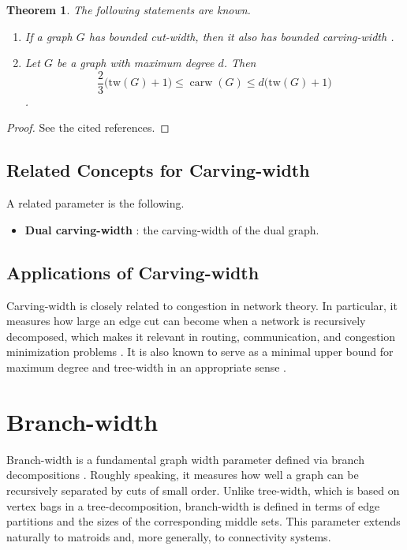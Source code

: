 \documentclass[10pt]{book}
\newcommand{\tw}{\mathrm{tw}}       %
\newtheorem{theorem}{Theorem}[section]
\theoremstyle{definition}
\begin{document}
\begin{theorem}
The following statements are known.
\begin{enumerate}
    \item If a graph \(G\) has bounded cut-width, then it also has bounded carving-width \cite{326}.

    \item Let \(G\) be a graph with maximum degree \(d\). Then
    \[
    \frac{2}{3}\bigl(\tw(G)+1\bigr)
    \leq
    \operatorname{carw}(G)
    \leq
    d\bigl(\tw(G)+1\bigr)
    \]
      \cite{bienstock1990embedding}.
\end{enumerate}
\end{theorem}

\begin{proof}
See the cited references.
\end{proof}

\subsection{Related Concepts for Carving-width}
A related parameter is the following.

\begin{itemize}
    \item \textbf{Dual carving-width} \cite{424}: the carving-width of the dual graph.
\end{itemize}

\subsection{Applications of Carving-width}
Carving-width is closely related to congestion in network theory.  
In particular, it measures how large an edge cut can become when a network is recursively decomposed, which makes it relevant in routing, communication, and congestion minimization problems \cite{256}.  
It is also known to serve as a minimal upper bound for maximum degree and tree-width in an appropriate sense \cite{311,337}.

\section{Branch-width}

Branch-width is a fundamental graph width parameter defined via branch decompositions \cite{9,10,47,282}.  
Roughly speaking, it measures how well a graph can be recursively separated by cuts of small order.  
Unlike tree-width, which is based on vertex bags in a tree-decomposition, branch-width is defined in terms of edge partitions and the sizes of the corresponding middle sets.  
This parameter extends naturally to matroids and, more generally, to connectivity systems.
\end{document}
